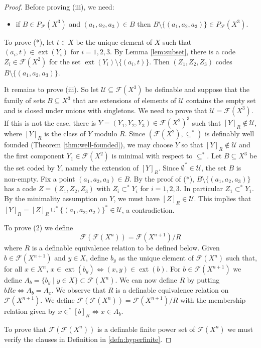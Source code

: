 \documentclass{amsart}
\newcommand{\ca}{\mathcal}
\newcommand{\nin}{\not \in}
\theoremstyle{plain}
\theoremstyle{definition}
\newcommand{\ins}{\in^*}
\newcommand{\F}{\mathcal{F}}
\newcommand{\ext}[1]{\operatorname{ext}(#1)}
\begin{document}
\begin{proof}
Before proving (iii), we need: 
\begin{itemize}
    \item[(*)] if $B \in P_{\F}(X^3)$ and $(a_1,a_2,a_3)\in B$ then $B \setminus \{(a_1,a_2,a_3) \}\in P_\F(X^3)$. 
\end{itemize}
To prove (*), let $t\in X$ be the unique element of $X$ such that  $(a_i,t)\in \ext{Y_i}$ for $i=1,2,3$. By Lemma \ref{lem:subset}, there is a code $Z_i\in \F(X^2)$ for the set $\ext {Y_i}\setminus \{(a_i, t)\}$. Then $(Z_1, Z_2, Z_3)$ codes $B \setminus \{(a_1,a_2,a_3)\}$. 

It remains to prove (iii). So let $\ca U\subseteq \F(X^3)$ be definable and suppose that the family of sets $B\subseteq X^3$ that are extensions of elements of $\ca U$ contains the empty set and is closed under unions with singletons. We need to prove that $\ca U = \F(X^3)$. If this is not the case, there is $Y = (Y_1, Y_2, Y_3) \in \F(X^2)^3$ such that $[Y]_R\nin \ca U$, where $[Y]_R$ is the class of $Y$ modulo $R$. Since $(\F(X^2), \subseteq^*)$ is definably well founded (Theorem \ref{thm:well-founded}), we may choose $Y$ so that $[Y]_R\nin \ca U$ and the first component $Y_1 \in \F(X^2)$ is minimal with respect to $\subseteq^*$. Let $B\subseteq X^3$ be the set coded by $Y$, namely the extension of $[Y]_R$. Since $\emptyset^* \in \ca U$, the set $B$ is non-empty. Fix a point $(a_1,a_2,a_3)\in B$. By the proof of (*), $B\setminus \{(a_1,a_2,a_3)\}$ has a code $Z = (Z_1, Z_2, Z_3)$ with $Z_i \subset^* Y_i$ for $i=1,2,3$. In particular $Z_1 \subset^* Y_1$. By the minimality assumption on $Y$, we must have $[Z]_R \in \ca U$. This implies that $[Y]_R  = [Z]_R \cup^* \{(a_1,a_2,a_2)\}^* \in \ca U$, a contradiction. 
 
\medskip
To prove (2) we define 
%
$$\F(\F(X^n)) = \F(X^{n+1})/R$$
%
where $R$ is a definable equivalence relation to be defined below. 
Given $b\in \F(X^{n+1})$ and $y\in X$, define $b_y$ as the unique element of $\F(X^n)$ such that, for all $x\in X^n$, $x\in \ext {b_y} \iff (x,y) \in \ext b$.  For $b\in \F(X^{n+1})$ we define $A_b = \{b_y \mid y\in X\} \subset \F(X^n)$. 
We can now define $R$ by putting $bRc\iff A_b = A_c$. We observe that $R$ is a definable equivalence relation on $\F(X^{n+1})$. We define $\F(\F(X^n)) = \F(X^{n+1})/R$ with the membership relation given by $x\ins [b]_R \iff x \in A_b$.  

To prove that $\F(\F(X^n))$ is a definable finite power set of $\F(X^n)$ we must verify the clauses in Definition in \ref{defn:hyperfinite}. 


\end{proof}
\end{document}
